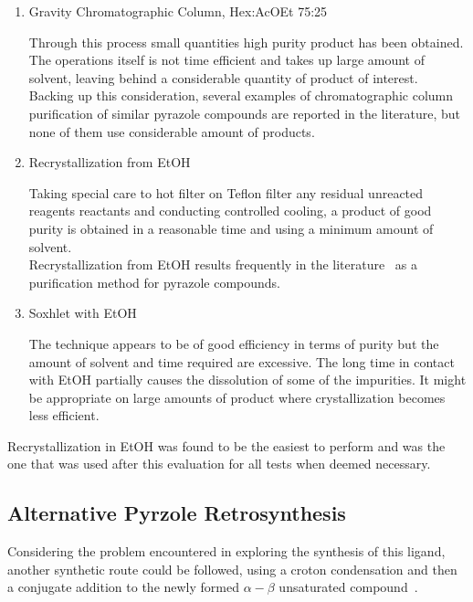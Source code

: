 \documentclass[../Master.tex]{subfiles}
\begin{document}
\begin{enumerate}
	\item  Gravity Chromatographic Column, Hex:AcOEt 75:25

	      Through this process small quantities high purity product has been obtained. The operations itself is not time efficient and takes up large amount of solvent, leaving behind a considerable quantity of product of interest.\\
	      Backing up this consideration, several examples of chromatographic column purification of similar pyrazole compounds are reported in the literature, but none of them use considerable amount of products.
	\item Recrystallization from EtOH

	      Taking special care to hot filter on Teflon filter any residual unreacted reagents reactants and conducting controlled cooling, a product of good purity is obtained in a reasonable time and using a minimum amount of solvent. \\
	      Recrystallization from EtOH results frequently in the literature\ \cite{joshi_synthesis_2004} as a purification method for pyrazole compounds.
	\item Soxhlet with EtOH

	      The technique appears to be of good efficiency in terms of purity but the amount of solvent and time required are excessive. The long time in contact with EtOH partially causes the dissolution of some of the impurities. It might be appropriate on large amounts of product where
	      crystallization becomes less efficient.
\end{enumerate}

Recrystallization in EtOH was found to be the easiest to perform and was the one that was used after this evaluation for all tests when deemed necessary.

\subsection{Alternative Pyrzole Retrosynthesis}\label{sec:alt-pyrazole-synthe}

Considering the problem encountered in exploring the synthesis of this ligand, another synthetic route could be followed, using a croton condensation and then a conjugate addition to the newly formed \(\alpha-\beta\) unsaturated compound\ \cite{cinar_synthesis_2021}.
\end{document}
